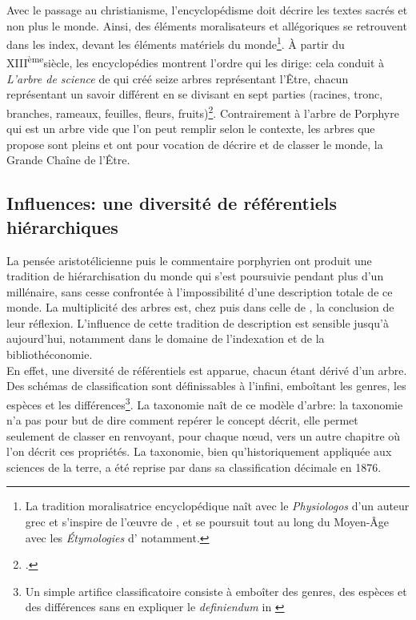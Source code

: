 Avec le passage au christianisme, l'encyclopédisme doit décrire les textes sacrés et non plus le monde. Ainsi, des éléments moralisateurs et allégoriques se retrouvent dans les index, devant les éléments matériels du monde\footnote{La tradition moralisatrice encyclopédique naît avec le \textit{Physiologos} d'un auteur grec et s'inspire de l'œuvre de , et se poursuit tout au long du Moyen-Âge avec les \textit{Étymologies} d' notamment.}. À partir du \textsc{XIII}\textsuperscript{ème}siècle, les encyclopédies montrent l'ordre qui les dirige: cela conduit à \textit{L'arbre de science} de  qui créé seize arbres représentant l'Être, chacun représentant un savoir différent en se divisant en sept parties (racines, tronc, branches, rameaux, feuilles, fleurs, fruits)\footcite[chap.10]{eco_arbre_2010}. Contrairement à l'arbre de Porphyre qui est un arbre vide que l'on peut remplir selon le contexte, les arbres que propose  sont pleins et ont pour vocation de décrire et de classer le monde, la Grande Chaîne de l'Être.

\subsection{\label{I-C-1-c}Influences: une diversité de référentiels hiérarchiques}

La pensée aristotélicienne puis le commentaire porphyrien ont produit une tradition de hiérarchisation du monde qui s'est poursuivie pendant plus d'un millénaire, sans cesse confrontée à l'impossibilité d'une description totale de ce monde. La multiplicité des arbres est, chez  puis dans celle de , la conclusion de leur réflexion. L'influence de cette tradition de description est sensible jusqu'à aujourd'hui, notamment dans le domaine de l'indexation et de la bibliothéconomie.\\

En effet, une diversité de référentiels est apparue, chacun étant dérivé d'un arbre. Des schémas de classification sont définissables à l'infini, emboîtant les genres, les espèces et les différences\footnote{\og Un simple artifice classificatoire consiste à emboîter des genres, des espèces et des différences sans en expliquer le \textit{definiendum}\fg{} in \cite[chap.1]{eco_arbre_2010}}. La taxonomie naît de ce modèle d'arbre: la taxonomie n'a pas pour but de dire comment repérer le concept décrit, elle permet seulement de classer en renvoyant, pour chaque nœud, vers un autre chapitre où l'on décrit ces propriétés. La taxonomie, bien qu'historiquement appliquée aux sciences de la terre, a été reprise par  dans sa classification décimale  en 1876.\\

